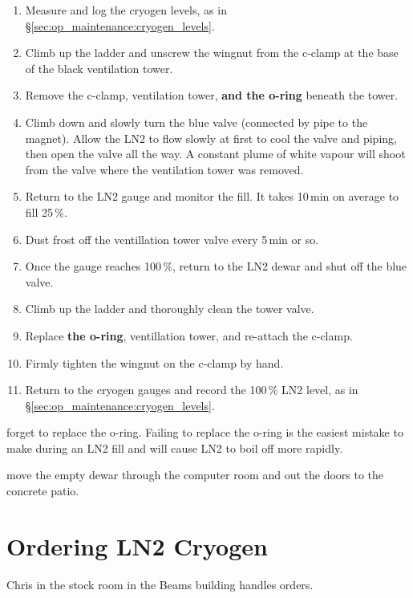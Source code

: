 \begin{enumerate}
\item Measure and log the cryogen levels, as in \S\ref{sec:op_maintenance:cryogen_levels}.
\item Climb up the ladder and unscrew the wingnut from the c-clamp at the base of the black ventilation tower.
\item Remove the c-clamp, ventilation tower, \textbf{and the o-ring} beneath the tower.
\item Climb down and slowly turn the blue valve (connected by pipe to the magnet).  Allow the LN2 to flow slowly at first to cool the valve and piping, then open the valve all the way.  A constant plume of white vapour will shoot from the valve where the ventilation tower was removed.
\item Return to the LN2 gauge and monitor the fill. It takes 10\,min on average to fill 25\,\%.
\item Dust frost off the ventillation tower valve every 5\,min or so.
\item Once the gauge reaches 100\,\%, return to the LN2 dewar and shut off the blue valve.
\item Climb up the ladder and thoroughly clean the tower valve.
\item Replace \textbf{the o-ring}, ventillation tower, and re-attach the c-clamp.
\item Firmly tighten the wingnut on the c-clamp by hand.
\item Return to the cryogen gauges and record the 100\,\% LN2 level, as in \S\ref{sec:op_maintenance:cryogen_levels}.
\end{enumerate}

\begin{pleasedonot} forget to replace the o-ring.  Failing to replace the o-ring is the easiest mistake to make during an LN2 fill and will cause LN2 to boil off more rapidly. \end{pleasedonot}

\begin{pleasedo} move the empty dewar through the computer room and out the doors to the concrete patio. \end{pleasedo}

\section{Ordering LN2 Cryogen}
\label{sec:op_maintenance:ordering_ln2}

\FIXME{} Chris in the stock room in the Beams building handles orders.

